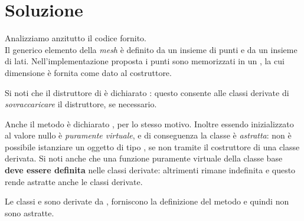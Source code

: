 \newpage

\section*{Soluzione}
Analizziamo anzitutto il codice fornito.\\
Il generico elemento
della \emph{mesh} \`e definito  da un insieme di punti e da un insieme
di lati. Nell'implementazione proposta i punti sono memorizzati in un
, la cui dimensione \`e fornita come dato al costruttore.

\lstset{basicstyle=\scriptsize\sf}


\lstset{basicstyle=\sf}

Si noti che il distruttore di  \`e dichiarato
: questo consente alle classi derivate di 
\emph{sovraccaricare} il distruttore, se necessario.

Anche il metodo
 \`e dichiarato , per lo stesso
motivo. Inoltre essendo inizializzato al valore nullo \`e
\emph{puramente virtuale}, e di conseguenza la classe  \`e
\emph{astratta}: non \`e possibile
istanziare un oggetto di tipo , se non tramite il
costruttore di una classe derivata. Si noti anche che una funzione
puramente virtuale della classe base \textbf{deve essere definita}
nelle classi derivate: altrimenti rimane indefinita e questo rende
astratte anche le classi derivate.


% 


Le classi  e  sono derivate da , forniscono 
la  definizione del metodo  e quindi non sono astratte. 

